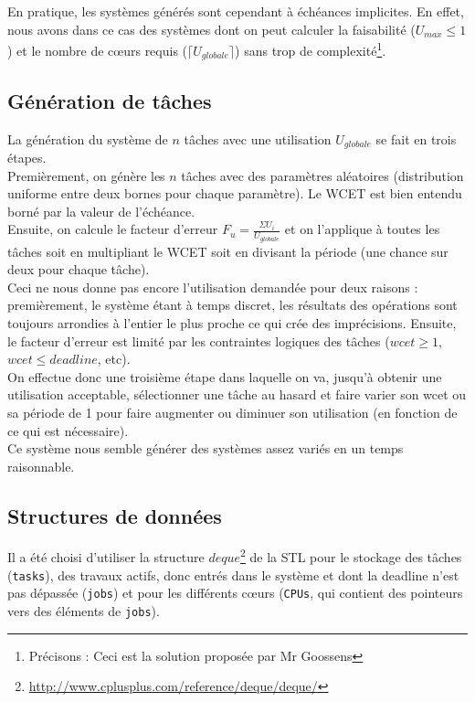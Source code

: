 \documentclass[a4paper,10pt]{article}
\begin{document}
		En pratique, les systèmes générés sont cependant à échéances implicites.
		En effet, nous avons dans ce cas des systèmes dont on peut calculer la faisabilité ($U_{max} \le 1$) et le nombre de cœurs requis ($\lceil 					U_{globale} \rceil$) sans trop de complexité\footnote{Précisons : Ceci est la solution proposée par Mr Goossens}.

	\subsection{Génération de tâches}
		La génération du système de $n$ tâches avec une utilisation $U_{globale}$ se fait en trois étapes.\\

		Premièrement, on génère les $n$ tâches avec des paramètres aléatoires (distribution uniforme entre deux bornes pour chaque paramètre). Le WCET est 			bien entendu borné par la valeur de l'échéance.\\

		Ensuite, on calcule le facteur d'erreur $F_u = \frac{\Sigma U_i}{U_{globale}}$ et on l'applique à toutes les tâches soit en multipliant le WCET 			soit en	divisant la période (une chance sur deux pour chaque tâche).\\

		Ceci ne nous donne pas encore l'utilisation demandée pour deux raisons : premièrement, le système étant à temps discret, les résultats des 					opérations sont toujours arrondies à l'entier le plus proche ce qui crée des imprécisions. Ensuite, le facteur d'erreur est limité par les 					contraintes logiques des tâches ($wcet \ge 1$, $wcet \le deadline$, etc).\\

		On effectue donc une troisième étape dans laquelle on va, jusqu'à obtenir une utilisation acceptable, sélectionner une tâche au hasard et faire 			varier son wcet ou sa période de 1 pour faire augmenter ou diminuer son utilisation (en fonction de ce qui est nécessaire).\\

		Ce système nous semble générer des systèmes assez variés en un temps raisonnable.

	\subsection{Structures de données}
		Il a été choisi d'utiliser la structure $deque$\footnote{\url{http://www.cplusplus.com/reference/deque/deque/}} de la STL pour le stockage des 				tâches (\verb?tasks?), des travaux actifs, donc entrés dans le système et dont la deadline n'est pas dépassée (\verb?jobs?) et pour les différents 			cœurs (\verb?CPUs?, qui contient des pointeurs vers des éléments de \verb?jobs?).\\
\end{document}
